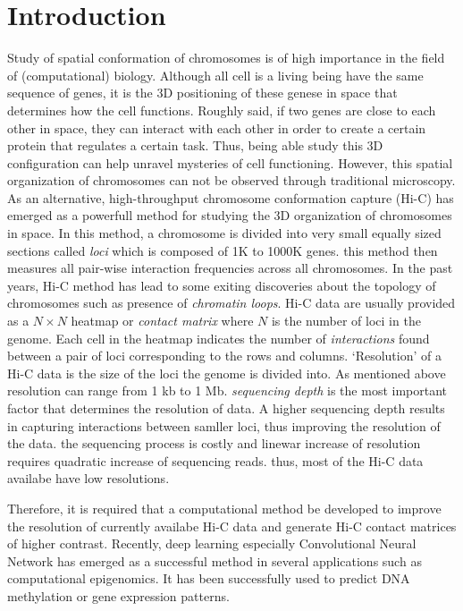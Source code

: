 \documentclass{article}
\begin{document}
\section{Introduction}
Study of spatial conformation of chromosomes is
of high importance in the field of (computational)
biology. Although all cell is a living being
have the same sequence of genes, it is the 
3D positioning of these genese in space that
determines how the cell functions.
Roughly said,
if two genes are close to each other in
space, they can interact with each other
in order to create a certain protein that
regulates a certain task.
Thus, being
able study this 3D configuration can help
unravel mysteries of cell functioning.
However, this spatial organization of chromosomes
can not be observed through traditional 
microscopy. As an alternative,
high-throughput chromosome conformation capture
(Hi-C) has emerged as
a powerfull method for studying the
3D organization of chromosomes in space.
In this method, a chromosome is divided into
very small equally sized
sections called \textit{loci}
which is composed of 1K to 1000K genes.
this method then
measures all pair-wise interaction frequencies 
across all chromosomes. 
In the past years, Hi-C method has lead to some
exiting discoveries about the topology of 
chromosomes such as presence of \textit{chromatin
loops}.
Hi-C data are usually provided as a $N \times N$
heatmap or \textit{contact matrix} where $N$ is 
the number of loci in the genome. Each cell in 
the heatmap indicates the number of \textit{interactions}
found between a pair of loci corresponding to the
rows and columns. `Resolution' of a Hi-C data
is the size of the loci the genome is
divided into.
As mentioned above
resolution can range from 1 kb to 1 Mb.
\textit{sequencing depth} is the most
important factor that determines the resolution
of data. A higher sequencing depth results in
capturing interactions between samller loci,
thus improving the resolution of the data.
the sequencing process is costly and 
linewar increase of resolution requires
quadratic increase of sequencing reads.
thus, most of the Hi-C data availabe have
low resolutions.

Therefore, it is required that a computational
method be developed to improve the resolution of
currently availabe Hi-C data and generate Hi-C
contact matrices of higher contrast.
Recently, deep learning 
especially Convolutional Neural Network
has emerged as a successful
method in several applications such as 
computational epigenomics. It has been
successfully used to predict DNA methylation
or gene expression patterns.
\end{document}
